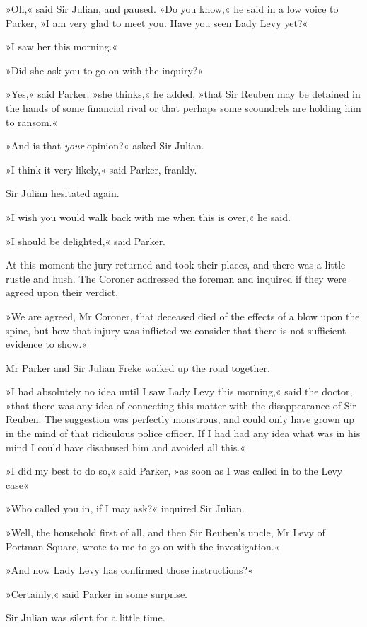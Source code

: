 »Oh,« said Sir Julian, and paused. »Do you know,« he said in a low voice to Parker, »I am very glad to meet you. Have you seen Lady Levy yet?«

»I saw her this morning.«

»Did she ask you to go on with the inquiry?«

»Yes,« said Parker; »she thinks,« he added, »that Sir Reuben may be detained in the hands of some financial rival or that perhaps some scoundrels are holding him to ransom.«

»And is that \textit{your} opinion?« asked Sir Julian.

»I think it very likely,« said Parker, frankly.

Sir Julian hesitated again.

»I wish you would walk back with me when this is over,« he said.

»I should be delighted,« said Parker.

At this moment the jury returned and took their places, and there was a little rustle and hush. The Coroner addressed the foreman and inquired if they were agreed upon their verdict.

»We are agreed, Mr Coroner, that deceased died of the effects of a blow upon the spine, but how that injury was inflicted we consider that there is not sufficient evidence to show.«

Mr Parker and Sir Julian Freke walked up the road together.

»I had absolutely no idea until I saw Lady Levy this morning,« said the doctor, »that there was any idea of connecting this matter with the disappearance of Sir Reuben. The suggestion was perfectly monstrous, and could only have grown up in the mind of that ridiculous police officer. If I had had any idea what was in his mind I could have disabused him and avoided all this.«

»I did my best to do so,« said Parker, »as soon as I was called in to the Levy case\longdash«

»Who called you in, if I may ask?« inquired Sir Julian.

»Well, the household first of all, and then Sir Reuben's uncle, Mr Levy of Portman Square, wrote to me to go on with the investigation.«

»And now Lady Levy has confirmed those instructions?«

»Certainly,« said Parker in some surprise.

Sir Julian was silent for a little time.

